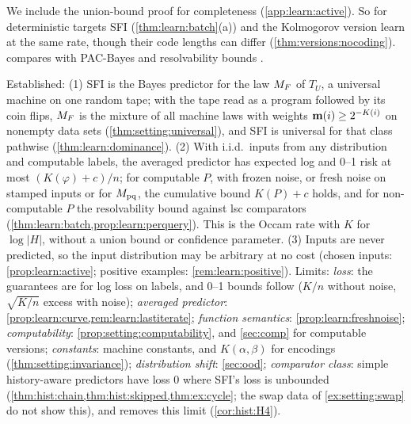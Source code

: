 We include the union-bound proof for completeness (\cref{app:learn:active}). So for deterministic targets SFI (\cref{thm:learn:batch}(a)) and the Kolmogorov version learn at the same rate, though their code lengths can differ (\cref{thm:versions:nocoding}).  compares with PAC-Bayes and resolvability bounds \citep{mcallester1999some,barron1991minimum}.

\begin{remark}\label{rem:learn:ideal}
Established: (1) SFI is the Bayes predictor for the law $M_{F}$ of $T_U$, a universal machine on one random tape; with the tape read as a program followed by its coin flips, $M_{F}$ is the mixture of all machine laws with weights $\mathbf{m}(i)\ge2^{-K(i)}$ on nonempty data sets (\cref{thm:setting:universal}), and SFI is universal for that class pathwise (\cref{thm:learn:dominance}). (2) With i.i.d.\ inputs from any distribution and computable labels, the averaged predictor has expected log and 0--1 risk at most $(K(\varphi)+c)/n$; for computable $P$, with frozen noise, or fresh noise on stamped inputs or for $M_{\mathrm{pq}}$, the cumulative bound $K(P)+c$ holds, and for non-computable $P$ the resolvability bound against lsc comparators (\cref{thm:learn:batch,prop:learn:perquery}). This is the Occam rate with $K$ for $\log|H|$, without a union bound or confidence parameter. (3) Inputs are never predicted, so the input distribution may be arbitrary at no cost (chosen inputs: \cref{prop:learn:active}; positive examples: \cref{rem:learn:positive}).
Limits: \emph{loss}: the guarantees are for log loss on labels, and 0--1 bounds follow ($K/n$ without noise, $\sqrt{K/n}$ excess with noise); \emph{averaged predictor}: \cref{prop:learn:curve,rem:learn:lastiterate}; \emph{function semantics}: \cref{prop:learn:freshnoise}; \emph{computability}: \cref{prop:setting:computability}, and \cref{sec:comp} for computable versions; \emph{constants}: machine constants, and $K(\alpha,\beta)$ for encodings (\cref{thm:setting:invariance}); \emph{distribution shift}: \cref{sec:ood}; \emph{comparator class}: simple history-aware predictors have loss $0$ where SFI's loss is unbounded (\cref{thm:hist:chain,thm:hist:skipped,thm:ex:cycle}; the swap data of \cref{ex:setting:swap} do not show this), and \SFIhist{} removes this limit (\cref{cor:hist:H4}).
\end{remark}
